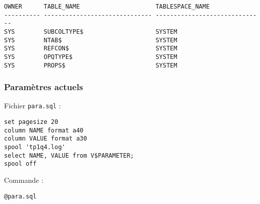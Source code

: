 \begin{verbatim}
OWNER      TABLE_NAME                     TABLESPACE_NAME                       
---------- ------------------------------ ------------------------------        
SYS        SUBCOLTYPE$                    SYSTEM                                
SYS        NTAB$                          SYSTEM                                
SYS        REFCON$                        SYSTEM                                
SYS        OPQTYPE$                       SYSTEM                                
SYS        PROPS$                         SYSTEM                             
\end{verbatim}

\subsubsection{Paramètres actuels}

Fichier \texttt{para.sql} :
\begin{verbatim}
set pagesize 20
column NAME format a40
column VALUE format a30
spool 'tp1q4.log'
select NAME, VALUE from V$PARAMETER;
spool off
\end{verbatim}

Commande :
\begin{verbatim}
@para.sql
\end{verbatim}

